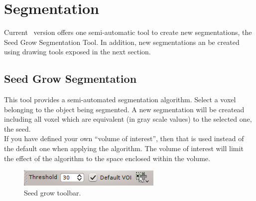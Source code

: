 \section{Segmentation}

Current \espina\ version offers one semi-automatic tool to create new
segmentations, the Seed Grow Segmentation Tool. In addition, new segmentations
an be created using drawing tools exposed in the next section.

\subsection{Seed Grow Segmentation}

This tool provides a semi-automated segmentation algorithm. Select a voxel
belonging to the object being segmented. A new segmentation will be createad
including all voxel which are equivalent (in gray scale values) to the selected
one, the seed.\\
If you have defined your own ``volume of interest'', then that is used instead of
the default one when applying the algorithm. The volume of interest will limit the
effect of the algorithm to the space enclosed within the volume.\\

\begin{figure}[H]
\centering
\includegraphics{fig/SeedGrowSegmentation}
\caption{Seed grow toolbar.}
\end{figure}
\vspace{0.3cm}

